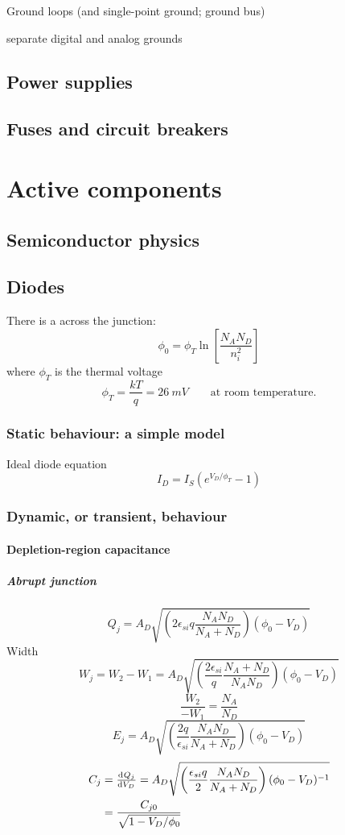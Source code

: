 \documentclass{report}
\begin{document}
Ground loops (and single-point ground; ground bus)

separate digital and analog grounds
\section{Power supplies}
\section{Fuses and circuit breakers}

\chapter{Active components}
\section{Semiconductor physics}
\section{Diodes}
There is a  across the junction:
\[ \phi_0 = \phi_T \ln \left[\frac{N_AN_D}{n_i^2}\right] \]
where $\phi_T$ is the thermal voltage
\[ \phi_T = \frac{kT}{q} = \SI{26}{mV} \qquad \text{at room temperature.} \]
\subsection{Static behaviour: a simple model}
Ideal diode equation
\[ I_D = I_S(e^{V_D/ \phi_T} - 1) \]
\subsection{Dynamic, or transient, behaviour}
\subsubsection{Depletion-region capacitance}
\paragraph{Abrupt junction}
\[ Q_j = A_D \sqrt{\left(2\epsilon_{si}q \frac{N_AN_D}{N_A+N_D}\right)(\phi_0 - V_D)} \]
Width
\[ W_j = W_2 - W_1 = A_D \sqrt{\left(\frac{2\epsilon_{si}}{q} \frac{N_A+N_D}{N_AN_D}\right)(\phi_0 - V_D)} \]
\[ \frac{W_2}{-W_1} = \frac{N_A}{N_D} \]
\[ E_j = A_D \sqrt{\left(\frac{2q}{\epsilon_{si}} \frac{N_AN_D}{N_A+N_D}\right)(\phi_0 - V_D)} \]
\begin{align*}
C_j &= \od{Q_j}{V_D} = A_D \sqrt{\left(\frac{\epsilon_{si}q}{2} \frac{N_AN_D}{N_A+N_D}\right)(\phi_0 - V_D)^{-1}} \\
&= \frac{C_{j0}}{\sqrt{1-V_D/ \phi_0}}
\end{align*}
\end{document}
